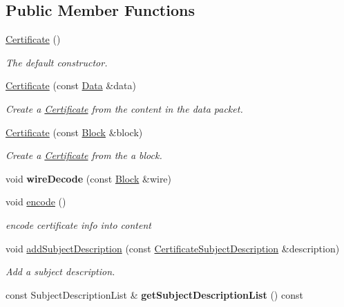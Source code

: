 \subsection*{Public Member Functions}
\begin{DoxyCompactItemize}
\item 
\hyperlink{classndn_1_1Certificate_a3c672fa2865740057602b19c5f635565}{Certificate} ()\hypertarget{classndn_1_1Certificate_a3c672fa2865740057602b19c5f635565}{}\label{classndn_1_1Certificate_a3c672fa2865740057602b19c5f635565}

\begin{DoxyCompactList}\small\item\em The default constructor. \end{DoxyCompactList}\item 
\hyperlink{classndn_1_1Certificate_ad31234d1f78b64676b9917f97aac06fa}{Certificate} (const \hyperlink{classndn_1_1Data}{Data} \&data)
\begin{DoxyCompactList}\small\item\em Create a \hyperlink{classndn_1_1Certificate}{Certificate} from the content in the data packet. \end{DoxyCompactList}\item 
\hyperlink{classndn_1_1Certificate_a9e275c377078fdabb3a778e6ab62e125}{Certificate} (const \hyperlink{classndn_1_1Block}{Block} \&block)
\begin{DoxyCompactList}\small\item\em Create a \hyperlink{classndn_1_1Certificate}{Certificate} from the a block. \end{DoxyCompactList}\item 
void {\bfseries wire\+Decode} (const \hyperlink{classndn_1_1Block}{Block} \&wire)\hypertarget{classndn_1_1Certificate_a1fd39de9d66970c252d29c5ffbd5f80a}{}\label{classndn_1_1Certificate_a1fd39de9d66970c252d29c5ffbd5f80a}

\item 
void \hyperlink{classndn_1_1Certificate_a2dee08a8e60c27c1c1304c0162d6c62b}{encode} ()\hypertarget{classndn_1_1Certificate_a2dee08a8e60c27c1c1304c0162d6c62b}{}\label{classndn_1_1Certificate_a2dee08a8e60c27c1c1304c0162d6c62b}

\begin{DoxyCompactList}\small\item\em encode certificate info into content \end{DoxyCompactList}\item 
void \hyperlink{classndn_1_1Certificate_af9e70c1de146fd73f1520bd50cd2c2b3}{add\+Subject\+Description} (const \hyperlink{classndn_1_1CertificateSubjectDescription}{Certificate\+Subject\+Description} \&description)
\begin{DoxyCompactList}\small\item\em Add a subject description. \end{DoxyCompactList}\item 
const Subject\+Description\+List \& {\bfseries get\+Subject\+Description\+List} () const\hypertarget{classndn_1_1Certificate_ab5f8b6aec037b54c82d87cae307c2335}{}\label{classndn_1_1Certificate_ab5f8b6aec037b54c82d87cae307c2335}


\end{DoxyCompactItemize}
